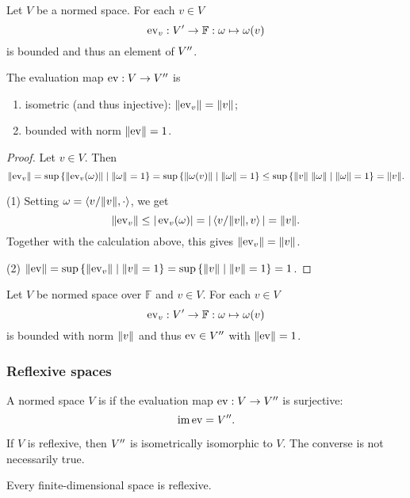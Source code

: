 \begin{proposition}
Let $V$ be a normed space. 
For each $v\in V$
\[ \operatorname{ev}_v: {V}^\prime \to \mathbb{F}: \omega \mapsto \omega(v) \]
is bounded and thus an element of ${V}^{\prime\prime}$.

The evaluation map $\operatorname{ev}: V \to {V}^{\prime\prime}$ is
\begin{enumerate}
\item isometric (and thus injective): $\lVert\operatorname{ev}_v\rVert = \lVert v\rVert$;
\item bounded with norm $\lVert\operatorname{ev}\rVert = 1$.
\end{enumerate}
\end{proposition}
\begin{proof}
Let $v\in V$. Then
\[ \lVert\operatorname{ev}_v\rVert = \sup\left\{ \lVert\operatorname{ev}_v(\omega)\rVert \;\middle|\; \lVert\omega\rVert=1 \right\} = \sup\left\{ \lVert\omega(v)\rVert \;\middle|\; \lVert\omega\rVert=1 \right\} \leq \sup\left\{ \lVert v\rVert\;\lVert\omega\rVert \;\middle|\; \lVert\omega\rVert=1 \right\} = \lVert v\rVert. \]

(1) Setting $\omega = \left\langle v/\lVert v\rVert, \cdot \right\rangle$, we get
\[ \lVert\operatorname{ev}_v\rVert \leq |\operatorname{ev}_v(\omega)| = |\left\langle v/\lVert v\rVert, v \right\rangle| = \lVert v\rVert. \]
Together with the calculation above, this gives $\lVert\operatorname{ev}_v\rVert = \lVert v\rVert$.

(2) $\lVert\operatorname{ev}\rVert = \sup\left\{ \lVert\operatorname{ev}_v\rVert \;\middle|\; \lVert v\rVert=1 \right\} = \sup\left\{ \lVert v\rVert \;\middle|\; \lVert v\rVert=1 \right\} = 1$.
\end{proof}

\begin{lemma}
Let $V$ be normed space over $\mathbb{F}$ and $v\in V$. For each $v\in V$
\[ \operatorname{ev}_v: {V}^\prime \to \mathbb{F}: \omega \mapsto \omega(v) \]
is bounded with norm $\lVert v\rVert$ and thus $\operatorname{ev}\in {V}^{\prime\prime}$ with $\lVert\operatorname{ev}\rVert = 1$.
\end{lemma}


\subsubsection{Reflexive spaces}
\begin{definition}
A normed space $V$ is  if the evaluation map $\operatorname{ev}:V\to {V}^{\prime\prime}$ is surjective:
\[ \operatorname{im}\operatorname{ev} = {V}^{\prime\prime}. \]
\end{definition}
If $V$ is reflexive, then ${V}^{\prime\prime}$ is isometrically isomorphic to $V$. The converse is not necessarily true.

\begin{lemma}
Every finite-dimensional space is reflexive.
\end{lemma}

